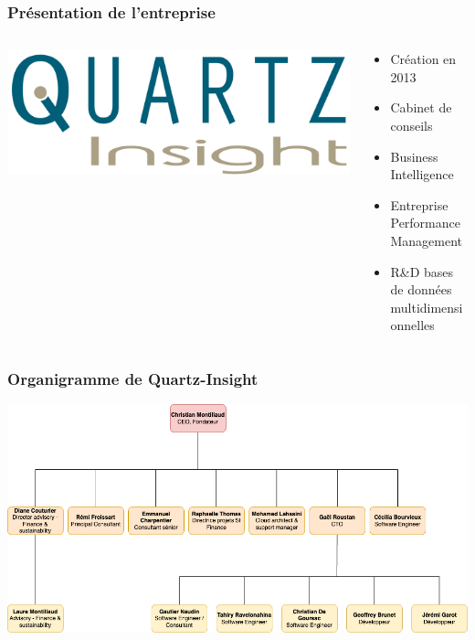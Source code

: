 \documentclass[aspectratio=169]{beamer}
\begin{document}
\begin{frame}
    \frametitle{Présentation de l'entreprise}
    \begin{columns}
        \begin{column}{0.5\textwidth}
            \includegraphics[height=0.20\textheight]{Imgs/logo-quartz-insight-v2.png}
        \end{column}
        \begin{column}{0.5\textwidth}
            \begin{itemize}
                \item Création en 2013
                \item Cabinet de conseils
                \item Business Intelligence
                \item Entreprise Performance Management
                \item R\&D bases de données multidimensionnelles
            \end{itemize}
        \end{column}
    \end{columns}
\end{frame}

\begin{frame}
    \frametitle{Organigramme de Quartz-Insight}
    \includegraphics[height=0.56\textheight]{Imgs/organigramme-quartz-insight.png}
\end{frame}
\end{document}
